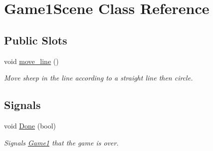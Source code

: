\hypertarget{classGame1Scene}{\section{\-Game1\-Scene \-Class \-Reference}
\label{classGame1Scene}
}
\subsection*{\-Public \-Slots}
\begin{DoxyCompactItemize}
\item 
void \hyperlink{classGame1Scene_a78806ef4597b5770184b46c194ff95c7}{move\-\_\-line} ()
\begin{DoxyCompactList}\small\item\em \-Move sheep in the line according to a straight line then circle. \end{DoxyCompactList}\end{DoxyCompactItemize}
\subsection*{\-Signals}
\begin{DoxyCompactItemize}
\item 
\hypertarget{classGame1Scene_a5dd2bbbbd2585ad528766db8b74c4534}{void \hyperlink{classGame1Scene_a5dd2bbbbd2585ad528766db8b74c4534}{\-Done} (bool)}\label{classGame1Scene_a5dd2bbbbd2585ad528766db8b74c4534}

\begin{DoxyCompactList}\small\item\em \-Signals \hyperlink{classGame1}{\-Game1} that the game is over. \end{DoxyCompactList}\end{DoxyCompactItemize}
